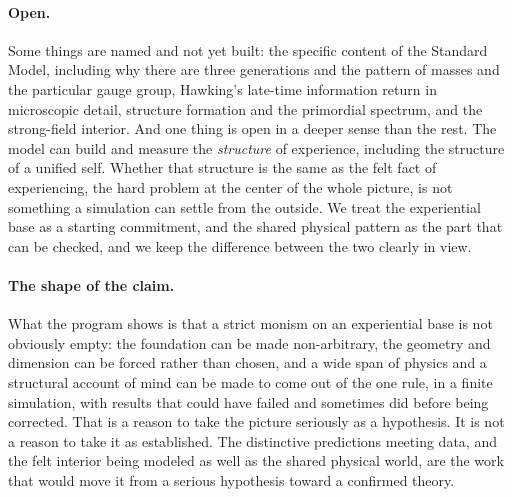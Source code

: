 \paragraph{Open.}
Some things are named and not yet built: the specific content of the Standard Model, including
why there are three generations and the pattern of masses and the particular gauge group,
Hawking's late-time information return in microscopic detail, structure formation and the
primordial spectrum, and the strong-field interior. And one thing is open in a deeper sense than
the rest. The model can build and measure the \emph{structure} of experience, including the
structure of a unified self. Whether that structure is the same as the felt fact of
experiencing, the hard problem at the center of the whole picture, is not something a simulation
can settle from the outside. We treat the experiential base as a starting commitment, and the
shared physical pattern as the part that can be checked, and we keep the difference between the
two clearly in view.

\paragraph{The shape of the claim.}
What the program shows is that a strict monism on an experiential base is not obviously empty:
the foundation can be made non-arbitrary, the geometry and dimension can be forced rather than
chosen, and a wide span of physics and a structural account of mind can be made to come out of
the one rule, in a finite simulation, with results that could have failed and sometimes did
before being corrected. That is a reason to take the picture seriously as a hypothesis. It is
not a reason to take it as established. The distinctive predictions meeting data, and the felt
interior being modeled as well as the shared physical world, are the work that would move it from
a serious hypothesis toward a confirmed theory.
